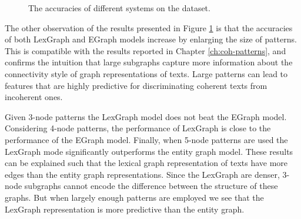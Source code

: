 \begin{figure}[!ht]
  \begin{center}
    \mydata
\end{center}
  \caption{The accuracies of different systems on the \pitlerds dataset.}
  \label{fig:pitler-ds}
\end{figure}

The other observation of the results presented in Figure \ref{fig:pitler-ds} is that the accuracies of both \mbox{LexGraph} and EGraph models increase by enlarging the size of patterns.  
This is compatible with the results reported in Chapter \ref{ch:coh-patterns}, and confirms the intuition that large subgraphs capture more information about the connectivity style of graph representations of texts.
Large patterns can lead to features that are highly predictive for discriminating coherent texts from incoherent ones. 

Given 3-node patterns the LexGraph model does not beat the EGraph model. 
Considering \mbox{4-node} patterns, the performance of LexGraph is close to the performance of the EGraph model. 
Finally, when 5-node patterns are used the LexGraph mode significantly outperforms the entity graph model. 
These results can be explained such that the lexical graph representation of texts have more edges than the entity graph representations. 
Since the LexGraph are denser, 3-node subgraphs cannot encode the difference between the structure of these graphs. 
But when largely enough patterns are employed we see that the LexGraph representation is more predictive than the entity graph.   

